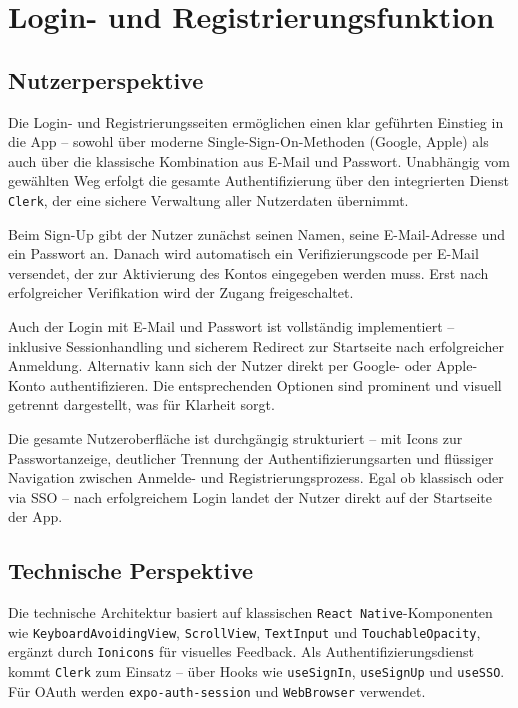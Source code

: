\section{Login- und Registrierungsfunktion}

\subsection{Nutzerperspektive}

Die Login- und Registrierungsseiten ermöglichen einen klar geführten Einstieg in die App – sowohl über moderne Single-Sign-On-Methoden (Google, Apple) als auch über die klassische Kombination aus E-Mail und Passwort. Unabhängig vom gewählten Weg erfolgt die gesamte Authentifizierung über den integrierten Dienst \texttt{Clerk}, der eine sichere Verwaltung aller Nutzerdaten übernimmt.

Beim Sign-Up gibt der Nutzer zunächst seinen Namen, seine E-Mail-Adresse und ein Passwort an. Danach wird automatisch ein Verifizierungscode per E-Mail versendet, der zur Aktivierung des Kontos eingegeben werden muss. Erst nach erfolgreicher Verifikation wird der Zugang freigeschaltet.

Auch der Login mit E-Mail und Passwort ist vollständig implementiert – inklusive Sessionhandling und sicherem Redirect zur Startseite nach erfolgreicher Anmeldung. Alternativ kann sich der Nutzer direkt per Google- oder Apple-Konto authentifizieren. Die entsprechenden Optionen sind prominent und visuell getrennt dargestellt, was für Klarheit sorgt.

Die gesamte Nutzeroberfläche ist durchgängig strukturiert – mit Icons zur Passwortanzeige, deutlicher Trennung der Authentifizierungsarten und flüssiger Navigation zwischen Anmelde- und Registrierungsprozess. Egal ob klassisch oder via SSO – nach erfolgreichem Login landet der Nutzer direkt auf der Startseite der App.

\subsection{Technische Perspektive}

Die technische Architektur basiert auf klassischen \texttt{React Native}-Komponenten wie \texttt{KeyboardAvoidingView}, \texttt{ScrollView}, \texttt{TextInput} und \texttt{TouchableOpacity}, ergänzt durch \texttt{Ionicons} für visuelles Feedback. Als Authentifizierungsdienst kommt \texttt{Clerk} zum Einsatz – über Hooks wie \texttt{useSignIn}, \texttt{useSignUp} und \texttt{useSSO}. Für OAuth werden \texttt{expo-auth-session} und \texttt{WebBrowser} verwendet.

